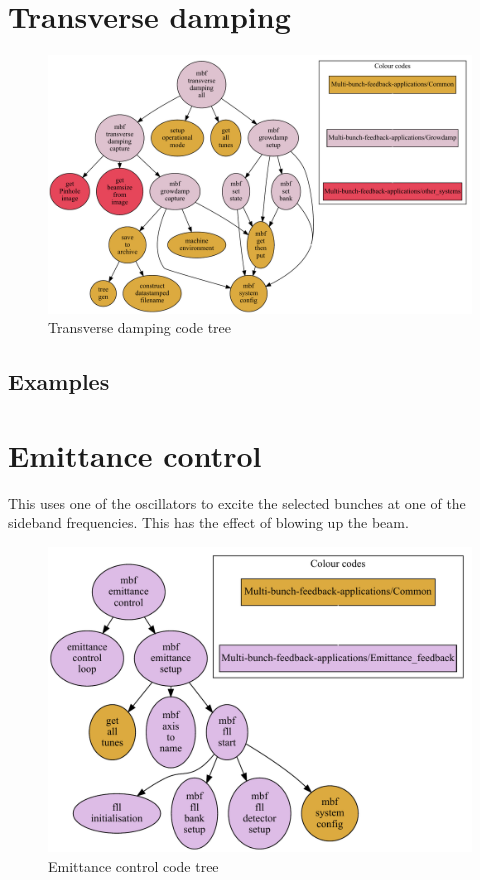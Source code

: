 \documentclass{report}
\begin{document}
\chapter{Transverse damping}
\begin{figure}[hbt]
   \centering
    \includegraphics[width=\textwidth]{mbf_transverse_damping_all.pdf}
    \caption{Transverse damping code tree}
     \label{fig:transverse_damping_code_tree}
\end{figure}
\section{Examples}

\chapter{Emittance control}
This uses one of the oscillators to excite the selected bunches at one of the sideband frequencies. This has the effect of blowing up the beam.
\begin{figure}[hbt]
   \centering
        \includegraphics[width=\textwidth]{mbf_emittance_control.pdf}
        \caption{Emittance control code tree}
		\label{fig:emittance_control_code_tree}
\end{figure}
\end{document}
